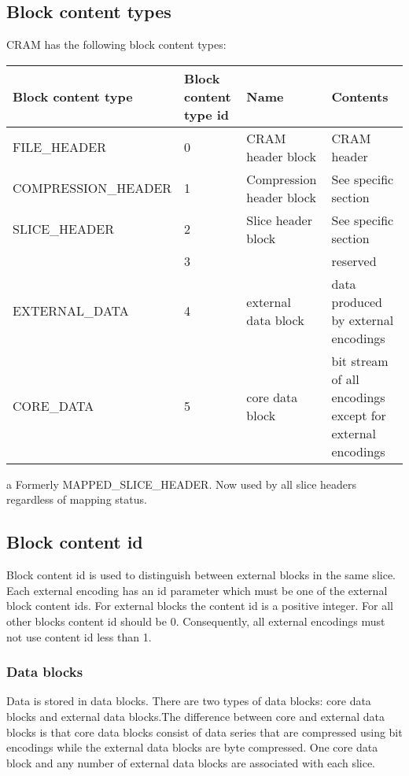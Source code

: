 \documentclass[a4paper]{article}
\begin{document}
\subsection{\textbf{Block content types}}

CRAM has the following block content types:

\begin{threeparttable}[t]
\begin{tabular}{|>{\raggedright}p{143pt}|>{\raggedright}p{45pt}|>{\raggedright}p{116pt}|>{\raggedright}p{114pt}|}
\hline
\textbf{Block content type} & \textbf{Block content type id} & \textbf{Name} & \textbf{Contents}\tabularnewline
\hline
FILE\_HEADER & 0 & CRAM header block & CRAM header\tabularnewline
\hline
COMPRESSION\_HEADER & 1 & Compression header block & See specific section\tabularnewline
\hline
SLICE\_HEADER\tnote{a} & 2 & Slice header block & See specific section\tabularnewline
\hline
 & 3 &  & reserved\tabularnewline
\hline
EXTERNAL\_DATA & 4 & external data block & data produced by external encodings\tabularnewline
\hline
CORE\_DATA & 5 & core data block & bit stream of all encodings except for external encodings\tabularnewline
\hline
\end{tabular}
\begin{tablenotes}
\item[a] Formerly MAPPED\_SLICE\_HEADER.  Now used by all slice headers regardless of mapping status.
\end{tablenotes}
\end{threeparttable}

\subsection{\textbf{Block content id}}

Block content id is used to distinguish between external blocks in the same slice. 
Each external encoding has an id parameter which must be one of the external block 
content ids. For external blocks the content id is a positive integer. For all 
other blocks content id should be 0. Consequently, all external encodings must 
not use content id less than 1. 

\subsubsection*{Data blocks}

Data is stored in data blocks. There are two types of data blocks: core data blocks 
and external data blocks.The difference between core and external data blocks is 
that core data blocks consist of data series that are compressed using bit encodings 
while the external data blocks are byte compressed. One core data block and any 
number of external data blocks are associated with each slice.
\end{document}
